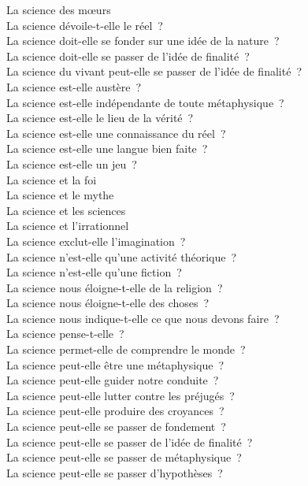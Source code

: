 \documentclass[a4paper,12pt]{article}
\begin{document}
La science des mœurs \\
La science dévoile-t-elle le réel ? \\
La science doit-elle se fonder sur une idée de la nature ? \\
La science doit-elle se passer de l'idée de finalité ? \\
La science du vivant peut-elle se passer de l'idée de finalité ? \\
La science est-elle austère ? \\
La science est-elle indépendante de toute métaphysique ? \\
La science est-elle le lieu de la vérité ? \\
La science est-elle une connaissance du réel ? \\
La science est-elle une langue bien faite ? \\
La science est-elle un jeu ? \\
La science et la foi \\
La science et le mythe \\
La science et les sciences \\
La science et l'irrationnel \\
La science exclut-elle l'imagination ? \\
La science n'est-elle qu'une activité théorique ? \\
La science n'est-elle qu'une fiction ? \\
La science nous éloigne-t-elle de la religion ? \\
La science nous éloigne-t-elle des choses ? \\
La science nous indique-t-elle ce que nous devons faire ? \\
La science pense-t-elle ? \\
La science permet-elle de comprendre le monde ? \\
La science peut-elle être une métaphysique ? \\
La science peut-elle guider notre conduite ? \\
La science peut-elle lutter contre les préjugés ? \\
La science peut-elle produire des croyances ? \\
La science peut-elle se passer de fondement ? \\
La science peut-elle se passer de l'idée de finalité ? \\
La science peut-elle se passer de métaphysique ? \\
La science peut-elle se passer d'hypothèses ? \\
\end{document}
